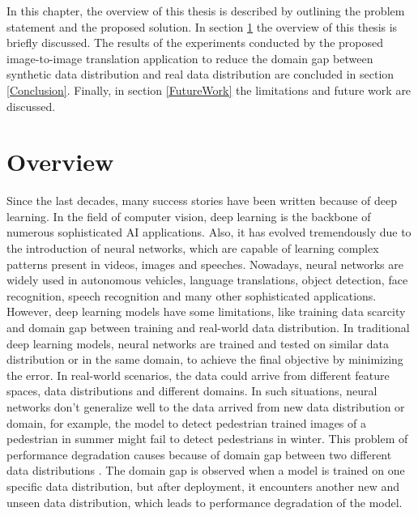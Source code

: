\justifying
\setlength{\parskip}{1em}



In this chapter, the overview of this thesis is described by outlining the problem statement and the proposed solution. In section \ref{Overview} the overview of this thesis is briefly discussed. The results of the experiments conducted by the proposed image-to-image translation application to reduce the domain gap between synthetic data distribution and real data distribution are concluded in section \ref{Conclusion}. Finally, in section \ref{FutureWork} the limitations and future work are discussed.


\section{Overview}\label{Overview}

Since the last decades, many success stories have been written because of deep learning. In the field of computer vision, deep learning is the backbone of numerous sophisticated \ac{AI} applications. Also, it has evolved tremendously due to the introduction of neural networks, which are capable of learning complex patterns present in videos, images and speeches. Nowadays, neural networks are widely used in autonomous vehicles, language translations, object detection, face recognition, speech recognition and many other sophisticated applications. However, deep learning models have some limitations, like training data scarcity and domain gap between training and real-world data distribution. In traditional deep learning models, neural networks are trained and tested on similar data distribution or in the same domain, to achieve the final objective by minimizing the error. In real-world scenarios, the data could arrive from different feature spaces, data distributions and different domains. In such situations, neural networks don't generalize well to the data arrived from new data distribution or domain, for example, the model to detect pedestrian trained images of a pedestrian in summer might fail to detect pedestrians in winter. This problem of performance degradation causes because of domain gap between two different data distributions \cite{farahani2020brief}. The domain gap is observed when a model is trained on one specific data distribution, but after deployment, it encounters another new and unseen data distribution, which leads to performance degradation of the model.

